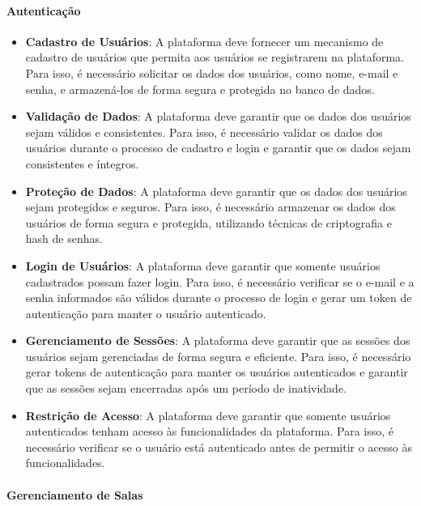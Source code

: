 \paragraph{Autenticação}

\begin{itemize}
    \item \textbf{Cadastro de Usuários}: A plataforma deve fornecer um mecanismo de cadastro de usuários que permita aos usuários se registrarem na plataforma. Para isso, é necessário solicitar os dados dos usuários, como nome, e-mail e senha, e armazená-los de forma segura e protegida no banco de dados.
    \item \textbf{Validação de Dados}: A plataforma deve garantir que os dados dos usuários sejam válidos e consistentes. Para isso, é necessário validar os dados dos usuários durante o processo de cadastro e login e garantir que os dados sejam consistentes e íntegros.
    \item \textbf{Proteção de Dados}: A plataforma deve garantir que os dados dos usuários sejam protegidos e seguros. Para isso, é necessário armazenar os dados dos usuários de forma segura e protegida, utilizando técnicas de criptografia e hash de senhas.
    \item \textbf{Login de Usuários}: A plataforma deve garantir que somente usuários cadastrados possam fazer login. Para isso, é necessário verificar se o e-mail e a senha informados são válidos durante o processo de login e gerar um token de autenticação para manter o usuário autenticado.
    \item \textbf{Gerenciamento de Sessões}: A plataforma deve garantir que as sessões dos usuários sejam gerenciadas de forma segura e eficiente. Para isso, é necessário gerar tokens de autenticação para manter os usuários autenticados e garantir que as sessões sejam encerradas após um período de inatividade.
    \item \textbf{Restrição de Acesso}: A plataforma deve garantir que somente usuários autenticados tenham acesso às funcionalidades da plataforma. Para isso, é necessário verificar se o usuário está autenticado antes de permitir o acesso às funcionalidades.
\end{itemize}

\paragraph{Gerenciamento de Salas}

